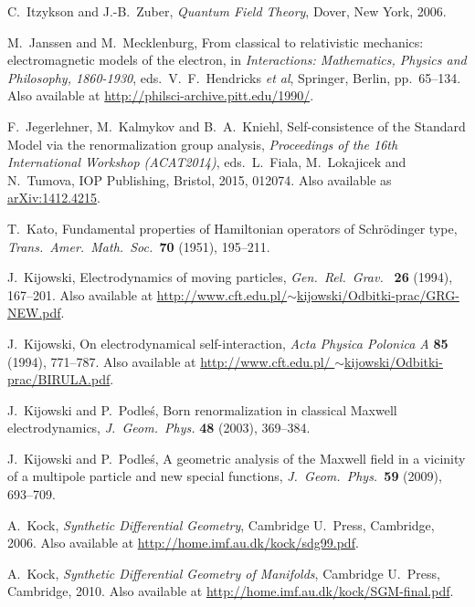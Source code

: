 \documentclass[12pt]{article}
\begin{document}
\begin{thebibliography}{10}
 C.\ Itzykson and J.-B.\ Zuber, \textsl{Quantum Field Theory}, Dover, New York, 2006.

 M.\ Janssen and M.\ Mecklenburg, From classical to relativistic mechanics: electromagnetic models of the electron, in \textsl{Interactions: Mathematics, Physics and Philosophy, 1860-1930}, eds.\ V.\ F.\ Hendricks \textit{et al}, Springer, Berlin, pp.\ 65--134.  Also available at \href{http://philsci-archive.pitt.edu/1990/}{http://philsci-archive.pitt.edu/1990/}.

 F.\ Jegerlehner, M.\ Kalmykov and B.\ A.\ Kniehl, Self-consistence of the Standard Model via the renormalization group analysis, \textsl{Proceedings of the 16th International Workshop (ACAT2014)}, eds.\ L.\ Fiala, M.\ Lokajicek and N.\ Tumova, IOP Publishing, Bristol, 2015, 012074. Also available as \href{http://arxiv.org/abs/1412.4215}{arXiv:1412.4215}.

 T.\ Kato, Fundamental properties of Hamiltonian operators of Schr\"odinger type, \textit{Trans.\ Amer.\ Math.\ Soc.\ }{\bf 70} (1951), 195--211.

 J.\ Kijowski, Electrodynamics of moving particles, 
\textsl{Gen.\ Rel.\ Grav.\ } \textbf{26} (1994), 167--201.  Also available at
\href{http://www.cft.edu.pl/~kijowski/Odbitki-prac/GRG-NEW.pdf}
{http://www.cft.edu.pl/\break $\sim$kijowski/Odbitki-prac/GRG-NEW.pdf}.

 J.\ Kijowski, On electrodynamical self-interaction, 
\textsl{Acta Physica Polonica A} \textbf{85} (1994), 771--787.
Also available at \href{http://www.cft.edu.pl/~kijowski/Odbitki-prac/BIRULA.pdf}
{http://www.cft.edu.pl/ \break $\sim$kijowski/Odbitki-prac/BIRULA.pdf}.

 J.\ Kijowski and P.\ Podle\'s, Born renormalization in classical Maxwell electrodynamics, \textsl{J.\ Geom.\ Phys.} \textbf{48} (2003), 369--384.

 J.\ Kijowski and P.\ Podle\'s, A geometric analysis of the Maxwell field in a vicinity of a multipole particle and new special functions, \textsl{J.\ Geom.\ Phys.\ }\textbf{59} (2009), 693--709.
 
 A.\ Kock, \textsl{Synthetic Differential Geometry}, 
Cambridge U.\ Press, Cambridge, 2006.  Also available at 
\href{http://home.imf.au.dk/kock/sdg99.pdf}{http://home.imf.au.dk/kock/sdg99.pdf}.

 A.\ Kock, \textsl{Synthetic Differential Geometry of Manifolds},
Cambridge U.\ Press, Cambridge, 2010.  Also available at 
\href{http://home.imf.au.dk/kock/SGM-final.pdf}{http://home.imf.au.dk/kock/SGM-final.pdf}.


\end{thebibliography}
\end{document}
